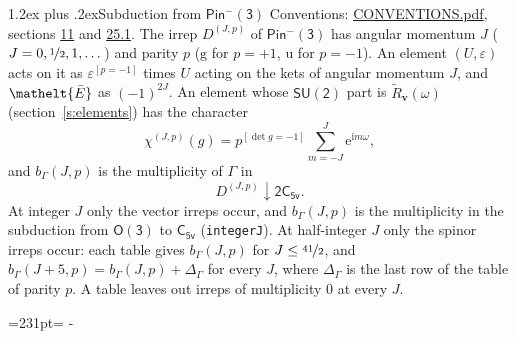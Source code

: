 \documentclass[10pt,a4paper]{article}
\makeatletter
\renewcommand\section{\@startsection{section}{1}{\z@}{-3ex plus -1ex minus -.2ex}%
  {1.2ex plus .2ex}{\normalfont\large\sffamily\bfseries\color{parttitle}}}
\newcommand{\needspace}[1]{\par\penalty-100\begingroup\dimen0=#1\relax\dimen2=\pagegoal
  \advance\dimen2-\pagetotal\ifdim\dimen0>\dimen2\relax\ifdim\dimen2>0pt\vfil\break\fi\fi
  \endgroup}
\numberwithin{equation}{section}
\newcommand{\eltfont}[1]{{\let\sigma\eltsigma\mathelt{#1}}}
\newcommand{\grp}[1]{\mathsf{#1}}
\newcommand{\elt}[1]{\eltfont{#1}}
\newcommand{\ptag}[1]{\mathrm{#1}}
\newcommand{\iverson}[1]{[#1]}
\newcommand{\restr}[2]{#1\!\downarrow#2}
\newcommand{\vv}{\mathbf{v}}
\newcommand{\iunit}{\mathrm{i}}
\newcommand{\expe}{\mathrm{e}}
\newcommand{\irrJp}[2]{D^{(#1,#2)}}
\newcommand{\barred}[1]{\bar{#1}}
\newcommand{\lift}[1]{\tilde{#1}}
\makeatother
\begin{document}
\section{Subduction from \texorpdfstring{$\grp{Pin^{-}(3)}$}{Pin(3)}}\label{s:subduction_parent}
Conventions: \href{../../CONVENTIONS.pdf}{CONVENTIONS.pdf}, sections \href{../../../rotation/CONVENTIONS.pdf\#conv.11}{11} and \href{../../CONVENTIONS.pdf\#conv.25.1}{25.1}.
\leavevmode\label{n:index.J}\label{n:index.parity}\label{n:irrep.o3}The irrep $\irrJp{J}{p}$ of \href{Pinminus3.pdf}{$\grp{Pin^{-}(3)}$} has angular momentum $J$ ($J = 0, \nicefrac{1}{2}, 1, \dots$) and parity $p$ ($\ptag{g}$ for $p = +1$, $\ptag{u}$ for $p = -1$). An element $(U, \varepsilon)$ acts on it as $\varepsilon^{[p = -1]}$ times $U$ acting on the kets of angular momentum $J$, and $\elt{\barred{E}}$ as $(-1)^{2J}$. \label{n:function.character.parent}\label{n:function.multiplicity}An element whose $\grp{SU(2)}$ part is $\lift{R}_{\vv}(\omega)$ (section~\ref{s:elements}) has the character
\begin{equation}\label{e:chi}\chi^{(J,p)}(g) = p^{\iverson{\det g = -1}}\sum_{m=-J}^{J} \expe^{\iunit m\omega},\end{equation}
and $b_\Gamma(J, p)$ is the multiplicity of $\Gamma$ in
\begin{equation}\label{e:parent}\restr{\irrJp{J}{p}}{\grp{2C_{5v}}}.\end{equation}
At integer $J$ only the vector irreps occur, and $b_\Gamma(J, p)$ is the multiplicity in the subduction from $\grp{O(3)}$ to \href{../../../rotation/data/pdf/C5v.pdf}{$\grp{C_{5v}}$} (\texttt{integerJ}). \label{n:index.increment}At half-integer $J$ only the spinor irreps occur: each table gives $b_\Gamma(J, p)$ for $J \le \nicefrac{41}{2}$, and $b_\Gamma(J + 5, p) = b_\Gamma(J, p) + \Delta_\Gamma$ for every $J$, where $\Delta_\Gamma$ is the last row of the table of parity $p$. A table leaves out irreps of multiplicity 0 at every $J$.
\needspace{231pt}
\end{document}
